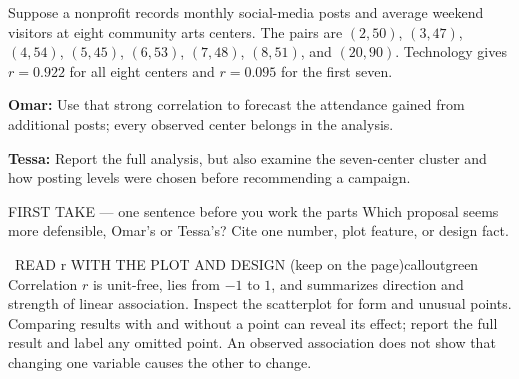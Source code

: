 \documentclass[11pt]{article}
\begin{document}


Suppose a nonprofit records monthly social-media posts and average weekend visitors at eight community arts centers. The pairs are $(2,50)$, $(3,47)$, $(4,54)$, $(5,45)$, $(6,53)$, $(7,48)$, $(8,51)$, and $(20,90)$. Technology gives $r=0.922$ for all eight centers and $r=0.095$ for the first seven.\par\smallskip \textbf{Omar:} Use that strong correlation to forecast the attendance gained from additional posts; every observed center belongs in the analysis.\par \textbf{Tessa:} Report the full analysis, but also examine the seven-center cluster and how posting levels were chosen before recommending a campaign.\par
\begin{center}
\end{center}
\begin{firsttakebox}{FIRST TAKE --- one sentence before you work the parts}
Which proposal seems more defensible, Omar's or Tessa's? Cite one number, plot feature, or design fact.
\workspace{0.85in}
\end{firsttakebox}

\begin{callout}{\IconBook\ READ r WITH THE PLOT AND DESIGN (keep on the page)}{calloutgreen}
Correlation $r$ is unit-free, lies from $-1$ to $1$, and summarizes direction and strength of linear association. Inspect the scatterplot for form and unusual points. Comparing results with and without a point can reveal its effect; report the full result and label any omitted point. An observed association does not show that changing one variable causes the other to change.
\end{callout}
\end{document}
